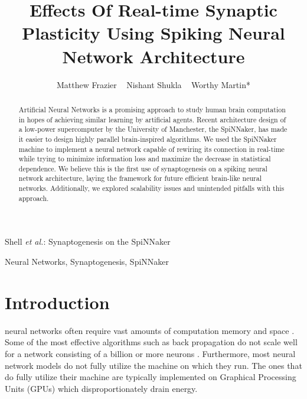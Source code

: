 \documentclass[journal]{./sty/IEEEtran}
\begin{document}
%
\title{Effects Of Real-time Synaptic Plasticity Using Spiking Neural Network Architecture
}


\author{Matthew Frazier ~
        Nishant Shukla ~
        Worthy Martin* }


%
{Shell \MakeLowercase{\textit{et al.}}: Synaptogenesis on the SpiNNaker}


\maketitle

\begin{abstract}
Artificial Neural Networks is a promising approach to study human brain computation in hopes of achieving similar learning by artificial agents.
Recent architecture design of a low-power supercomputer by the University of Manchester, the SpiNNaker,
has made it easier to design highly parallel brain-inspired algorithms.
We used the SpiNNaker machine to implement a neural network capable of rewiring its connection 
in real-time while trying to minimize information loss and maximize the decrease in statistical dependence.
We believe this is the first use of synaptogenesis on a spiking neural network architecture, 
laying the framework for future efficient brain-like neural networks.
Additionally, we explored scalability issues and unintended pitfalls with this approach.

\end{abstract}

\begin{IEEEkeywords}
Neural Networks, Synaptogenesis, SpiNNaker
\end{IEEEkeywords}


\section{Introduction}
 neural networks often require vast amounts of computation memory and space \cite{CorrMatr:Levy}.
Some of the most effective algorithms such as back propagation do not scale well for a network consisting of a billion or more neurons \cite{backprop:Qun}.
Furthermore, most neural network models do not fully utilize the machine on which they run. 
The ones that do fully utilize their machine are typically implemented on Graphical Processing Units (GPUs) which disproportionately drain energy.
\end{document}
